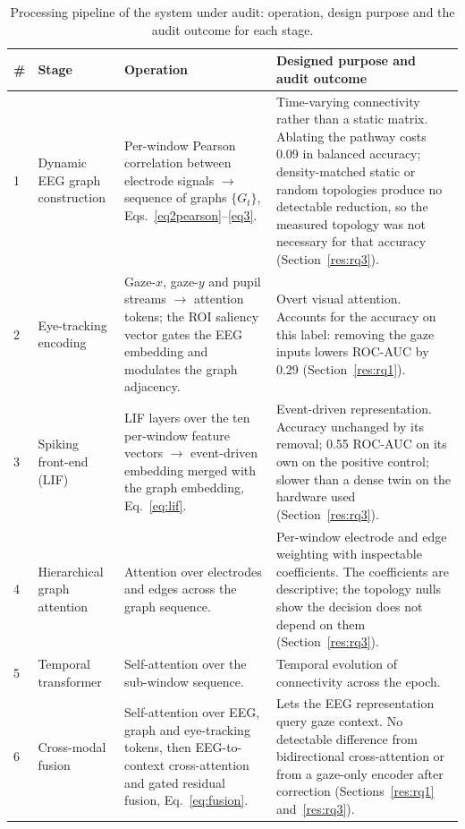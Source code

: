 \begin{table}[!htbp]
\caption{Processing pipeline of the system under audit: operation, design purpose and the audit outcome for each stage.}\label{tab_pipeline}
\footnotesize
\begin{tabular}{@{}p{0.3cm}p{2.9cm}p{5.2cm}p{5.2cm}@{}}
\toprule
\# & Stage & Operation & Designed purpose and audit outcome \\
\midrule
1 & Dynamic EEG graph construction & Per-window Pearson correlation between electrode signals $\rightarrow$ sequence of graphs $\{G_t\}$, Eqs.~\eqref{eq2pearson}--\eqref{eq3}. & Time-varying connectivity rather than a static matrix. Ablating the pathway costs 0.09 in balanced accuracy; density-matched static or random topologies produce no detectable reduction, so the measured topology was not necessary for that accuracy (Section~\ref{res:rq3}). \\
2 & Eye-tracking encoding & Gaze-$x$, gaze-$y$ and pupil streams $\rightarrow$ attention tokens; the ROI saliency vector gates the EEG embedding and modulates the graph adjacency. & Overt visual attention. Accounts for the accuracy on this label: removing the gaze inputs lowers ROC-AUC by 0.29 (Section~\ref{res:rq1}). \\
3 & Spiking front-end (LIF) & LIF layers over the ten per-window feature vectors $\rightarrow$ event-driven embedding merged with the graph embedding, Eq.~\eqref{eq:lif}. & Event-driven representation. Accuracy unchanged by its removal; 0.55 ROC-AUC on its own on the positive control; slower than a dense twin on the hardware used (Section~\ref{res:rq3}). \\
4 & Hierarchical graph attention & Attention over electrodes and edges across the graph sequence. & Per-window electrode and edge weighting with inspectable coefficients. The coefficients are descriptive; the topology nulls show the decision does not depend on them (Section~\ref{res:rq3}). \\
5 & Temporal transformer & Self-attention over the sub-window sequence. & Temporal evolution of connectivity across the epoch. \\
6 & Cross-modal fusion & Self-attention over EEG, graph and eye-tracking tokens, then EEG-to-context cross-attention and gated residual fusion, Eq.~\eqref{eq:fusion}. & Lets the EEG representation query gaze context. No detectable difference from bidirectional cross-attention or from a gaze-only encoder after correction (Sections~\ref{res:rq1} and~\ref{res:rq3}). \\

\end{tabular}
\end{table}
